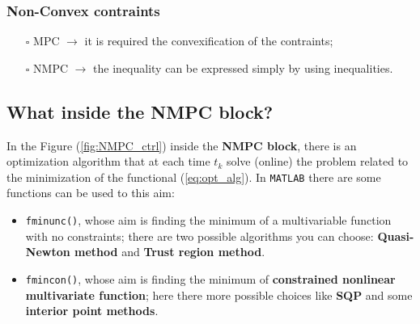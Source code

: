 \subsubsection{Non-Convex contraints}
\begin{itemize}
    \itemsep 0em
    \item[$\square$] MPC $\rightarrow$ it is required the convexification of the contraints;
    \item [$\square$] NMPC $\rightarrow$ the inequality can be expressed simply by using inequalities.
\end{itemize}

\subsection*{What inside the NMPC block?}
In the Figure (\ref{fig:NMPC_ctrl}) inside the \textbf{NMPC block}, there is an optimization algorithm that at each time $t_k$ solve (online) the problem related to the minimization of the functional (\ref{eq:opt_alg}). In \texttt{MATLAB} there are some functions can be used to this aim: 
\begin{itemize}
    \itemsep0em
    \item \texttt{fminunc()}, whose aim is finding the minimum of a multivariable function with no constraints; there are two possible algorithms you can choose: \textbf{Quasi-Newton method} and \textbf{Trust region method}. 
    
    \item \texttt{fmincon()}, whose aim is finding the minimum of \textbf{constrained nonlinear multivariate function}; here there more possible choices like \textbf{SQP} and some \textbf{interior point methods}.
\end{itemize}
